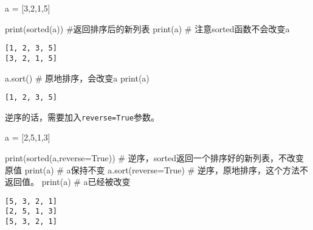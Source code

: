 \documentclass[
  letterpaper,
  DIV=11,
  numbers=noendperiod]{scrreprt}
\newenvironment{Shaded}{\begin{snugshade}}{\end{snugshade}}
\newcommand{\BuiltInTok}[1]{\textcolor[rgb]{0.00,0.23,0.31}{#1}}
\newcommand{\CommentTok}[1]{\textcolor[rgb]{0.37,0.37,0.37}{#1}}
\newcommand{\DecValTok}[1]{\textcolor[rgb]{0.68,0.00,0.00}{#1}}
\newcommand{\NormalTok}[1]{\textcolor[rgb]{0.00,0.23,0.31}{#1}}
\newcommand{\OperatorTok}[1]{\textcolor[rgb]{0.37,0.37,0.37}{#1}}
\newcommand{\VariableTok}[1]{\textcolor[rgb]{0.07,0.07,0.07}{#1}}
\begin{document}
\begin{Shaded}
\begin{Highlighting}[]
\NormalTok{a }\OperatorTok{=}\NormalTok{ [}\DecValTok{3}\NormalTok{,}\DecValTok{2}\NormalTok{,}\DecValTok{1}\NormalTok{,}\DecValTok{5}\NormalTok{]}
\end{Highlighting}
\end{Shaded}

\begin{Shaded}
\begin{Highlighting}[]
\BuiltInTok{print}\NormalTok{(}\BuiltInTok{sorted}\NormalTok{(a)) }\CommentTok{\#返回排序后的新列表}
\BuiltInTok{print}\NormalTok{(a) }\CommentTok{\# 注意sorted函数不会改变a}
\end{Highlighting}
\end{Shaded}

\begin{verbatim}
[1, 2, 3, 5]
[3, 2, 1, 5]
\end{verbatim}

\begin{Shaded}
\begin{Highlighting}[]
\NormalTok{a.sort() }\CommentTok{\# 原地排序，会改变a}
\BuiltInTok{print}\NormalTok{(a)}
\end{Highlighting}
\end{Shaded}

\begin{verbatim}
[1, 2, 3, 5]
\end{verbatim}

逆序的话，需要加入\texttt{reverse=True}参数。

\begin{Shaded}
\begin{Highlighting}[]
\NormalTok{a }\OperatorTok{=}\NormalTok{ [}\DecValTok{2}\NormalTok{,}\DecValTok{5}\NormalTok{,}\DecValTok{1}\NormalTok{,}\DecValTok{3}\NormalTok{]}

\BuiltInTok{print}\NormalTok{(}\BuiltInTok{sorted}\NormalTok{(a,reverse}\OperatorTok{=}\VariableTok{True}\NormalTok{)) }\CommentTok{\# 逆序，sorted返回一个排序好的新列表，不改变原值}
\BuiltInTok{print}\NormalTok{(a) }\CommentTok{\# a保持不变}
\NormalTok{a.sort(reverse}\OperatorTok{=}\VariableTok{True}\NormalTok{) }\CommentTok{\# 逆序，原地排序，这个方法不返回值。}
\BuiltInTok{print}\NormalTok{(a) }\CommentTok{\# a已经被改变}
\end{Highlighting}
\end{Shaded}

\begin{verbatim}
[5, 3, 2, 1]
[2, 5, 1, 3]
[5, 3, 2, 1]
\end{verbatim}
\end{document}
